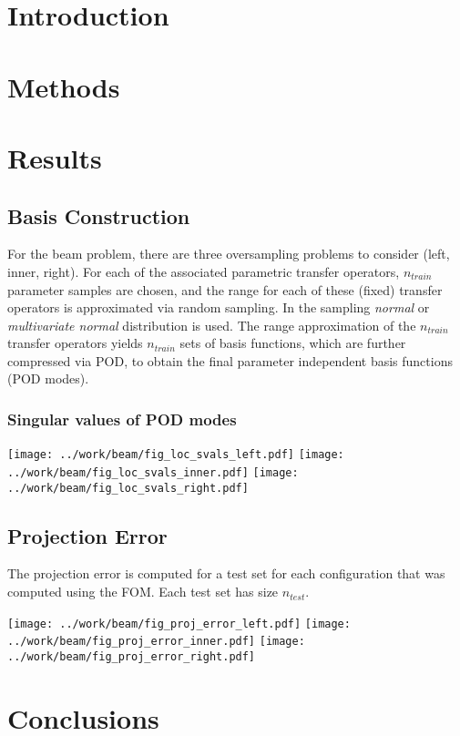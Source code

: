 \documentclass{scrartcl}
\begin{document}

\section{Introduction}

\section{Methods}

\section{Results}

\subsection{Basis Construction}
For the beam problem, there are three oversampling problems to consider (left, inner, right).
For each of the associated parametric transfer operators, $n_{train}$ parameter samples are chosen, and
the range for each of these (fixed) transfer operators is approximated via random sampling. In
the sampling \textit{normal} or \textit{multivariate normal} distribution is used.
The range approximation of the $n_{train}$ transfer operators yields $n_{train}$ sets of
basis functions, which are further compressed via POD, to obtain the final parameter
independent basis functions (POD modes).

\subsubsection{Singular values of POD modes}

\texttt{[image: ../work/beam/fig\_loc\_svals\_left.pdf]}
\texttt{[image: ../work/beam/fig\_loc\_svals\_inner.pdf]}
\texttt{[image: ../work/beam/fig\_loc\_svals\_right.pdf]}

\subsection{Projection Error}
The projection error is computed for a test set for each configuration that was computed
using the FOM. Each test set has size $n_{test}$.

\texttt{[image: ../work/beam/fig\_proj\_error\_left.pdf]}
\texttt{[image: ../work/beam/fig\_proj\_error\_inner.pdf]}
\texttt{[image: ../work/beam/fig\_proj\_error\_right.pdf]}

\section{Conclusions}

\end{document}
